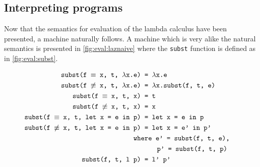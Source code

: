 \subsection{Interpreting programs}
Now that the semantics for evaluation of the lambda calculus have been presented, a machine naturally follows.
A machine which is very alike the natural semantics is presented in \autoref{fig:eval:laznaive} where the \texttt{subst} function is defined as in \autoref{fig:eval:subst}.
\begin{figure}[p]
\begin{mdframed}
\begin{align}
  \texttt{subst(f $\equiv$ x, t, $\lambda$x.e) }&\texttt{= $\lambda$x.e} \tag*{}\\
  \texttt{subst(f $\not\equiv$ x, t, $\lambda$x.e) }&\texttt{= $\lambda$x.subst(f, t, e)} \tag*{}\\
  \texttt{subst(f $\equiv$ x, t, x) }&\texttt{= t} \tag*{}\\
  \texttt{subst(f $\not\equiv$ x, t, x) }&\texttt{= x} \tag*{}\\
  \texttt{subst(f $\equiv$ x, t, let x = e in p) }&\texttt{= let x = e in p} \tag*{}\\
  \texttt{subst(f $\not\equiv$ x, t, let x = e in p) }&\texttt{= let x = e' in p'} \tag*{}\\
  \wherecase{e' = subst(f, t, e),}\tag*{}\\
  \extracase{p' = subst(f, t, p)}\tag*{}\\
  \texttt{subst(f, t, l p) }&\texttt{= l' p'}\tag*{}\\

\end{align}
\end{mdframed}
\end{figure}
